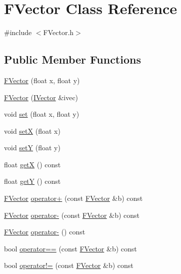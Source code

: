 \hypertarget{class_f_vector}{\section{F\+Vector Class Reference}
\label{class_f_vector}
}


{\ttfamily \#include $<$F\+Vector.\+h$>$}

\subsection*{Public Member Functions}
\begin{DoxyCompactItemize}
\item 
\hyperlink{class_f_vector_af2a73e04b3a4d8772fc1107d32564c71}{F\+Vector} (float x, float y)
\item 
\hyperlink{class_f_vector_a74398bbeb713718d5ae0a900b6ef6e70}{F\+Vector} (\hyperlink{class_i_vector}{I\+Vector} \&ivec)
\item 
void \hyperlink{class_f_vector_a7f53366605bff26e627b6f334564439f}{set} (float x, float y)
\item 
void \hyperlink{class_f_vector_a7a2406c460b67cf5c56838d5f5937f6d}{set\+X} (float x)
\item 
void \hyperlink{class_f_vector_a5830ec2729f21ebac8a0db30d39504ad}{set\+Y} (float y)
\item 
float \hyperlink{class_f_vector_afd24396a2dc52bdfd42319fcbb40fb11}{get\+X} () const 
\item 
float \hyperlink{class_f_vector_a119d9c993e02fa7bc43d89b1d17974c8}{get\+Y} () const 
\item 
\hyperlink{class_f_vector}{F\+Vector} \hyperlink{class_f_vector_a10b6f21e8ac84f7fe5cfc90461d1f864}{operator+} (const \hyperlink{class_f_vector}{F\+Vector} \&b) const 
\item 
\hyperlink{class_f_vector}{F\+Vector} \hyperlink{class_f_vector_a104f8b6b84df43227a8fafbb8baebc33}{operator-\/} (const \hyperlink{class_f_vector}{F\+Vector} \&b) const 
\item 
\hyperlink{class_f_vector}{F\+Vector} \hyperlink{class_f_vector_aafe386b055c93c7ac854a470dba06eee}{operator-\/} () const 
\item 
bool \hyperlink{class_f_vector_a26006bc12031dd369e5245736b0b8eab}{operator==} (const \hyperlink{class_f_vector}{F\+Vector} \&b) const 
\item 
bool \hyperlink{class_f_vector_a0a7901828830a37b6c7afa03280830e3}{operator!=} (const \hyperlink{class_f_vector}{F\+Vector} \&b) const 
\end{DoxyCompactItemize}


